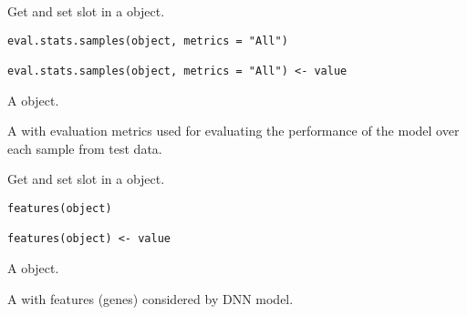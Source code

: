 \documentclass[a4paper]{book}
\begin{document}
%
\begin{Description}\relax
Get and set  slot in a
 object.
\end{Description}
%
\begin{Usage}
\begin{verbatim}
eval.stats.samples(object, metrics = "All")

eval.stats.samples(object, metrics = "All") <- value
\end{verbatim}
\end{Usage}
%
\begin{Arguments}
\begin{ldescription}
\item[\code{object}] A  object.

\item[\code{value}] A  with evaluation metrics used for evaluating the
performance of the model over each sample from test data.
\end{ldescription}
\end{Arguments}
%
\begin{Description}\relax
Get and set  slot in a 
object.
\end{Description}
%
\begin{Usage}
\begin{verbatim}
features(object)

features(object) <- value
\end{verbatim}
\end{Usage}
%
\begin{Arguments}
\begin{ldescription}
\item[\code{object}] A  object.

\item[\code{value}] A  with features (genes) considered by DNN model.
\end{ldescription}
\end{Arguments}
\end{document}
